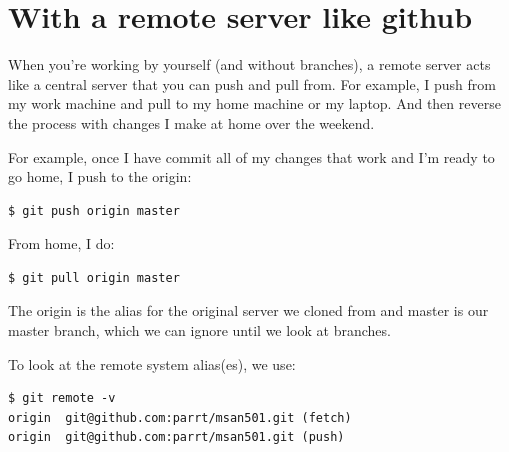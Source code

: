 \documentclass[titlepage]{tufte-book}
\begin{document}
\section{With a remote server like github}

When you're working by yourself (and without branches), a remote server acts like a central server that you can push and pull from. For example, I push from my work machine and pull to my home machine or my laptop. And then reverse the process with changes I make at home over the weekend.

For example, once I have commit all of my changes that work and I'm ready to go home, I push to the origin:

\begin{lstlisting}[style=BashInputStyle]
$ git push origin master
\end{lstlisting}

\noindent From home, I do:

\begin{lstlisting}[style=BashInputStyle]
$ git pull origin master
\end{lstlisting}

\noindent The origin is the alias for the original server we cloned from and master is our master branch, which we can ignore until we look at branches.

To look at the remote system alias(es), we use:

\begin{lstlisting}[style=BashInputStyle]
$ git remote -v
origin  git@github.com:parrt/msan501.git (fetch)
origin  git@github.com:parrt/msan501.git (push)
\end{lstlisting}
\end{document}
